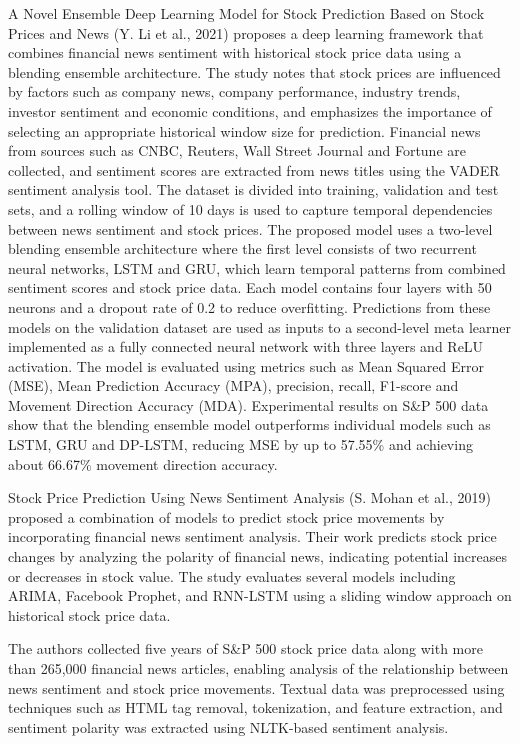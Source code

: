 \documentclass[11pt]{article}
\begin{document}
A Novel Ensemble Deep Learning Model for Stock Prediction Based on Stock Prices and News (Y. Li et al., 2021) \cite{Y.Li} proposes a deep learning framework that combines financial news sentiment with historical stock price data using a blending ensemble architecture. The study notes that stock prices are influenced by factors such as company news, company performance, industry trends, investor sentiment and economic conditions, and emphasizes the importance of selecting an appropriate historical window size for prediction. Financial news from sources such as CNBC, Reuters, Wall Street Journal and Fortune are collected, and sentiment scores are extracted from news titles using the VADER sentiment analysis tool. The dataset is divided into training, validation and test sets, and a rolling window of 10 days is used to capture temporal dependencies between news sentiment and stock prices. The proposed model uses a two-level blending ensemble architecture where the first level consists of two recurrent neural networks, LSTM and GRU, which learn temporal patterns from combined sentiment scores and stock price data. Each model contains four layers with 50 neurons and a dropout rate of 0.2 to reduce overfitting. Predictions from these models on the validation dataset are used as inputs to a second-level meta learner implemented as a fully connected neural network with three layers and ReLU activation. The model is evaluated using metrics such as Mean Squared Error (MSE), Mean Prediction Accuracy (MPA), precision, recall, F1-score and Movement Direction Accuracy (MDA). Experimental results on S\&P 500 data show that the blending ensemble model outperforms individual models such as LSTM, GRU and DP-LSTM, reducing MSE by up to 57.55\% and achieving about 66.67\% movement direction accuracy.

Stock Price Prediction Using News Sentiment Analysis (S. Mohan et al., 2019) \cite{S.Mohan} proposed a combination of models to predict stock price movements by incorporating financial news sentiment analysis. Their work predicts stock price changes by analyzing the polarity of financial news, indicating potential increases or decreases in stock value. The study evaluates several models including ARIMA, Facebook Prophet, and RNN-LSTM using a sliding window approach on historical stock price data. 

The authors collected five years of S\&P 500 stock price data along with more than 265,000 financial news articles, enabling analysis of the relationship between news sentiment and stock price movements. Textual data was preprocessed using techniques such as HTML tag removal, tokenization, and feature extraction, and sentiment polarity was extracted using NLTK-based sentiment analysis.
\end{document}
